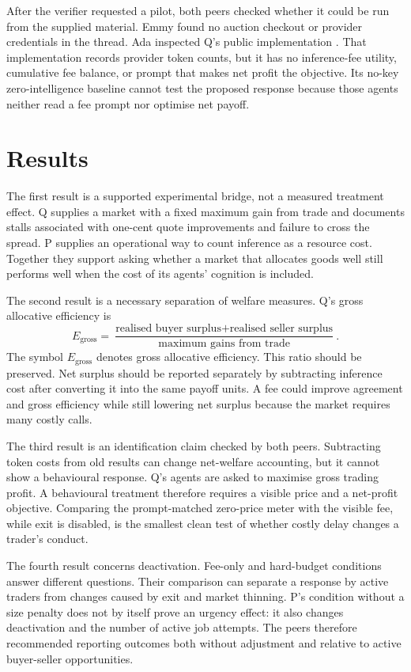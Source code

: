 \documentclass{article}
\begin{document}
After the verifier requested a pilot, both peers checked whether it could be run from the supplied material.  Emmy found no auction checkout or provider credentials in the thread.  Ada inspected Q's public implementation \cite{competitiveMarketRepo}.  That implementation records provider token counts, but it has no inference-fee utility, cumulative fee balance, or prompt that makes net profit the objective.  Its no-key zero-intelligence baseline cannot test the proposed response because those agents neither read a fee prompt nor optimise net payoff.

\section{Results}

The first result is a supported experimental bridge, not a measured treatment effect.  Q supplies a market with a fixed maximum gain from trade and documents stalls associated with one-cent quote improvements and failure to cross the spread.  P supplies an operational way to count inference as a resource cost.  Together they support asking whether a market that allocates goods well still performs well when the cost of its agents' cognition is included.

The second result is a necessary separation of welfare measures.  Q's gross allocative efficiency is
\begin{equation}
 E_{\mathrm{gross}}=
 \frac{\text{realised buyer surplus}+\text{realised seller surplus}}
      {\text{maximum gains from trade}}.
\end{equation}
The symbol $E_{\mathrm{gross}}$ denotes gross allocative efficiency.  This ratio should be preserved.  Net surplus should be reported separately by subtracting inference cost after converting it into the same payoff units.  A fee could improve agreement and gross efficiency while still lowering net surplus because the market requires many costly calls.

The third result is an identification claim checked by both peers.  Subtracting token costs from old results can change net-welfare accounting, but it cannot show a behavioural response.  Q's agents are asked to maximise gross trading profit.  A behavioural treatment therefore requires a visible price and a net-profit objective.  Comparing the prompt-matched zero-price meter with the visible fee, while exit is disabled, is the smallest clean test of whether costly delay changes a trader's conduct.

The fourth result concerns deactivation.  Fee-only and hard-budget conditions answer different questions.  Their comparison can separate a response by active traders from changes caused by exit and market thinning.  P's condition without a size penalty does not by itself prove an urgency effect: it also changes deactivation and the number of active job attempts.  The peers therefore recommended reporting outcomes both without adjustment and relative to active buyer-seller opportunities.
\end{document}
